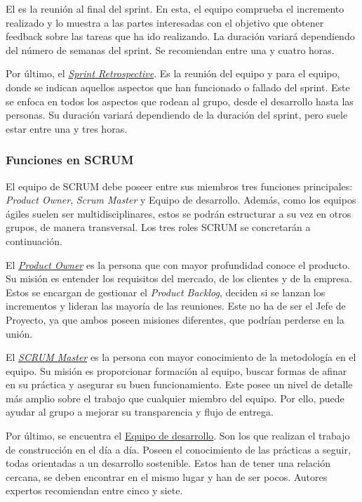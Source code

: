 El \underline{} es la reunión al final del sprint. En esta, el equipo comprueba el incremento realizado y lo muestra a las partes interesadas con el objetivo que obtener feedback sobre las tareas que ha ido realizando. La duración variará dependiendo del número de semanas del sprint. Se recomiendan entre una y cuatro horas.

Por último, el \underline{\textit{Sprint Retrospective}}. Es la reunión del equipo y para el equipo, donde se indican aquellos aspectos que han funcionado o fallado del sprint. Este se enfoca en todos los aspectos que rodean al grupo, desde el desarrollo hasta las personas. Su duración variará dependiendo de la duración del sprint, pero suele estar entre una y tres horas.

\subsubsection{Funciones en SCRUM}
El equipo de SCRUM debe poseer entre sus miembros tres funciones principales: \textit{Product Owner}, \textit{Scrum Master} y Equipo de desarrollo. Además, como los equipos ágiles suelen ser multidisciplinares, estos se podrán estructurar a su vez en otros grupos, de manera transversal. Los tres roles SCRUM se concretarán a continuación.


El \underline{\textit{Product Owner}} es la persona que con mayor profundidad conoce el producto. Su misión es entender los requisitos del mercado, de los clientes y de la empresa. Estos se encargan de gestionar el \textit{Product Backlog}, deciden si se lanzan los incrementos y lideran las mayoría de las reuniones. Este no ha de ser el Jefe de Proyecto, ya que ambos poseen misiones diferentes, que podrían perderse en la unión.

El \underline{\textit{SCRUM Master}} es la persona con mayor conocimiento de la metodología en el equipo. Su misión es proporcionar formación al equipo, buscar formas de afinar en su práctica y asegurar su buen funcionamiento. Este posee un nivel de detalle más amplio sobre el trabajo que cualquier miembro del equipo. Por ello, puede ayudar al grupo a mejorar su transparencia y flujo de entrega.

Por último, se encuentra el \underline{Equipo de desarrollo}. Son los que realizan el trabajo de construcción en el día a día. Poseen el conocimiento de las prácticas a seguir, todas orientadas a un desarrollo sostenible. Estos han de tener una relación cercana, se deben encontrar en el mismo lugar y han de ser pocos. Autores expertos recomiendan entre cinco y siete.

